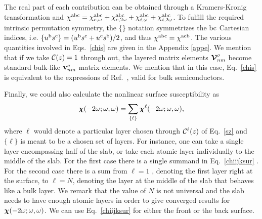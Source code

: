 \documentclass[floatfix,prb,aps,superscriptaddress,11pt,preprint,letterpaper]{revtex4}
\def\chon{black}
\begin{document}
The real part of each contribution can be obtained through
a Kramers-Kronig transformation\cite{nicolasPRB14} {\color{\chon} and}
$\chi^{\mathrm{a}\mathrm{b}\mathrm{c}}=
\chi^{\mathrm{a}\mathrm{b}\mathrm{c}}_{e,\omega} 
+\chi^{\mathrm{a}\mathrm{b}\mathrm{c}}_{e,2\omega}
+\chi^{\mathrm{a}\mathrm{b}\mathrm{c}}_{i,\omega} 
+\chi^{\mathrm{a}\mathrm{b}\mathrm{c}}_{i,2\omega}
$.
To fulfill the required intrinsic permutation symmetry, %
the $\{\}$ notation symmetrizes the $\mathrm{b}\mathrm{c}$ Cartesian indices, i.e. 
$\{u^{\mathrm{b}}s^{\mathrm{c}}\}=(u^{\mathrm{b}}s^{\mathrm{c}}+u^{\mathrm{c}}s^{\mathrm{b}})/2$,
and thus
$\chi^{\mathrm{a}\mathrm{b}\mathrm{c}}=\chi^{\mathrm{a}\mathrm{c}\mathrm{b}}$.
The various quantities involved in Eqs.~\eqref{chis} are given in
the Appendix \ref{appe}. 
We mention that if we take ${\mathbf{\cal C}}(z)=1$ through out, the layered
matrix elements $\boldsymbol{\mathcal{\cal V}}^{\sigma}_{nm}$ become standard bulk-like
$\mathbf{v}^{\sigma}_{nm}$ matrix elements. We mention that in this
case, Eq.~\eqref{chis} is equivalent to the expressions of
Ref.~, valid for bulk semiconductors.
 
Finally, we could also calculate the nonlinear surface susceptibility as 
\begin{equation}\label{chiijksur}
\boldsymbol{\chi}(-2\omega;\omega,\omega)
= \sum_{\{\ell\}}\boldsymbol{\chi}^\ell(-2\omega;\omega,\omega),
\end{equation} 
where $\ell$ would denote a particular layer chosen through
${\mathbf{\cal C}}^\ell(z)$ of Eq.~\eqref{sz} and
$\{\ell\}$
is meant to be {\color{\chon} a chosen set of layers.} For instance, 
one {\color{\chon} can take a single layer 
encompassing} half of the slab, or {\color{\chon} take each 
atomic layer individually to the middle} 
of the slab. {\color{\chon} For} the first case there is 
{\color{\chon} a} single summand
in Eq.~\eqref{chiijksur}{\color{\chon} . For the second case
there is} a sum from $\ell=1${\color{\chon} , denoting the first layer 
right at the surface, to $\ell=N$, denoting the layer at the middle of the slab 
that behaves like a bulk layer.}
We {\color{\chon} remark} that the value of 
$N$ is not universal {\color{\chon} and} 
the slab needs to have enough atomic layers 
{\color{\chon} in} order to give converged results for 
$\boldsymbol{\chi} (-2\omega;\omega,\omega)$. 
We can use Eq.~\eqref{chiijksur} for 
either the front or the back surface. 
\cite{mejiaRMF04}
\end{document}
